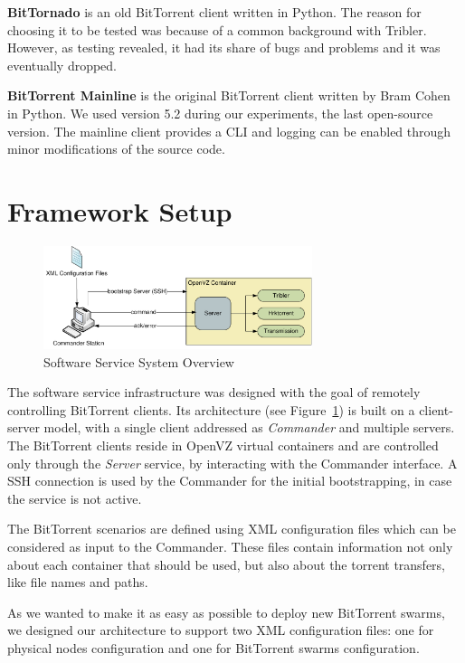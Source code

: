 \textbf{BitTornado} is an old BitTorrent client written in Python. The reason
for choosing it to be tested was because of a common background with Tribler.
However, as testing revealed, it had its share of bugs and problems and it was
eventually dropped.

\textbf{BitTorrent Mainline} is the original BitTorrent client written by Bram
Cohen in Python. We used version 5.2 during our experiments, the last
open-source version. The mainline client provides a CLI and logging can be
enabled through minor modifications of the source code.

\section{Framework Setup}
\label{sec:deploy-fwork}

\begin{figure}[h]
  \begin{center}
    \includegraphics[width=0.7\textwidth]{src/img/virt-infra/service-arch}
  \end{center}
  \caption{Software Service System Overview}
  \label{fig:virt-infra:service-arch}
\end{figure}

The software service infrastructure was designed with the goal of remotely
controlling BitTorrent clients. Its architecture (see
Figure~\ref{fig:virt-infra:service-arch}) is built on a client-server model,
with a single client addressed as \textit{Commander} and multiple servers. The
BitTorrent clients reside in OpenVZ virtual containers and are controlled only
through the \textit{Server} service, by interacting with the Commander
interface. A SSH connection is used by the Commander for the initial
bootstrapping, in case the service is not active.

The BitTorrent scenarios are defined using XML configuration files which can
be considered as input to the Commander. These files contain information not
only about each container that should be used, but also about the torrent
transfers, like file names and paths.

As we wanted to make it as easy as possible to deploy new BitTorrent swarms,
we designed our architecture to support two XML configuration files: one for
physical nodes configuration and one for BitTorrent swarms configuration.

